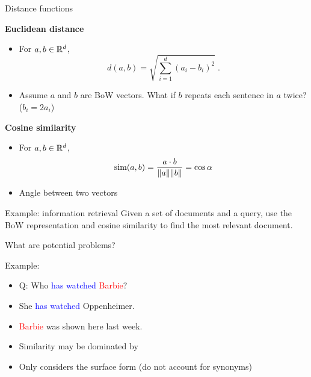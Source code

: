 \documentclass[usenames,dvipsnames,notes,11pt,aspectratio=169]{beamer}
\begin{document}
\begin{frame}
    {Distance functions}

    \textbf{Euclidean distance}\\
    \begin{itemize}
        \item[] For $a,b\in\mathbb{R}^d$,
            $$
            d(a,b) = \sqrt{\sum_{i=1}^d(a_i-b_i)^2} \;.
            $$
            \pause
        \item[] Assume $a$ and $b$ are BoW vectors. What if $b$ repeats each sentence in $a$ twice?
            \pause ($b_i=2a_i$)
    \end{itemize}

    \pause
    \textbf{Cosine similarity}\\
    \begin{itemize}
        \item[] For $a,b\in\mathbb{R}^d$,
            $$
            \text{sim}(a,b) = \frac{a\cdot b}{\|a\|\|b\|} = \cos\alpha
            $$
        \item[] Angle between two vectors
    \end{itemize}
\end{frame}

\begin{frame}
    {Example: information retrieval}
    Given a set of documents and a query,
    use the BoW representation and cosine similarity
    to find the most relevant document.

    What are potential problems?

    Example:\\
    \begin{itemize}
        \item[] Q: Who \textcolor{blue}{has watched} \textcolor{red}{Barbie}?
        \item[] She \textcolor{blue}{has} \textcolor{blue}{watched} Oppenheimer.
        \item[] \textcolor{red}{Barbie} was shown here last week.
    \end{itemize}

    \pause
    \begin{itemize}
        \item Similarity may be dominated by 
        \item Only considers the surface form (\eg do not account for synonyms)
    \end{itemize}
    
\end{frame}
\end{document}
